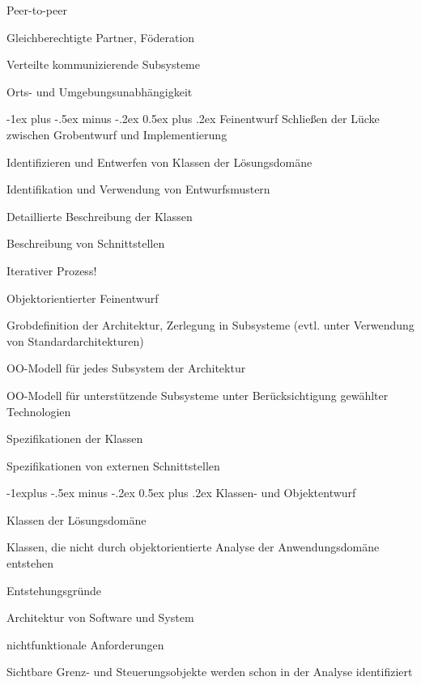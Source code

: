 \documentclass[a4paper]{article}
\makeatletter
\renewcommand{\section}{\@startsection{section}{1}{0mm}%
                                {-1ex plus -.5ex minus -.2ex}%
                                {0.5ex plus .2ex}%
                                {\normalfont\large\bfseries}}
\renewcommand{\subsection}{\@startsection{subsection}{2}{0mm}%
                                {-1explus -.5ex minus -.2ex}%
                                {0.5ex plus .2ex}%
                                {\normalfont\normalsize\bfseries}}
\makeatother
\begin{document}
\begin{multicols}{3}
  Peer-to-peer
  \begin{itemize*}
    \item Gleichberechtigte Partner, Föderation
    \item Verteilte kommunizierende Subsysteme
    \item Orts- und Umgebungsunabhängigkeit
  \end{itemize*}


  \newpage
  \section{Feinentwurf}
  Schließen der Lücke zwischen Grobentwurf und Implementierung
  \begin{itemize*}
    \item Identifizieren und Entwerfen von Klassen der Lösungsdomäne
    \item Identifikation und Verwendung von Entwurfsmustern
    \item Detaillierte Beschreibung der Klassen
    \item Beschreibung von Schnittstellen
    \item Iterativer Prozess!
  \end{itemize*}

  Objektorientierter Feinentwurf
  \begin{itemize*}
    \item Grobdefinition der Architektur, Zerlegung in Subsysteme (evtl. unter Verwendung von Standardarchitekturen)
    \item OO-Modell für jedes Subsystem der Architektur
    \item OO-Modell für unterstützende Subsysteme unter Berücksichtigung gewählter Technologien
    \item Spezifikationen der Klassen
    \item Spezifikationen von externen Schnittstellen
  \end{itemize*}

  \subsection{Klassen- und Objektentwurf}
  \begin{itemize*}
    \item Klassen der Lösungsdomäne
    \item Klassen, die nicht durch objektorientierte Analyse der Anwendungsdomäne entstehen
    \item Entstehungsgründe
    \begin{itemize*}
      \item Architektur von Software und System
      \item nichtfunktionale Anforderungen
      \item Sichtbare Grenz- und Steuerungsobjekte werden schon in der Analyse identifiziert
    \end{itemize*}
  \end{itemize*}


\end{multicols}
\end{document}

